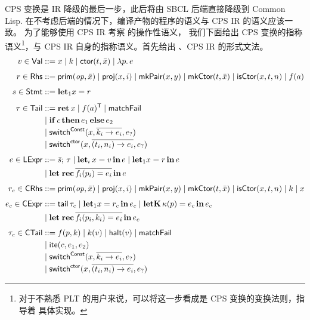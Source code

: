 CPS 变换是 IR 降级的最后一步，此后将由 SBCL 后端直接降级到 Common Lisp.
在不考虑后端的情况下，编译产物的程序的语义与 CPS IR 的语义应该一致。
为了能够使用 CPS IR 考察 \Tigris 的操作性语义，
我们下面给出 CPS 变换的指称语义\footnote{
  对于不熟悉 PLT 的用户来说，可以将这一步看成是 CPS 变换的变换法则，指导着
  具体实现。
}，与 CPS IR 自身的指称语义。首先给出 \Lambdair、CPS IR 的形式文法。
\begingroup\allowdisplaybreaks\setlength{\abovedisplayskip}{3pt}\setlength{\belowdisplayskip}{3pt}
\begin{equation}\label{eq:lambda-cps-formal}
  \begin{aligned}
    v \in \mathsf{Val} &::= x \mid k \mid \mathsf{ctor}(t, \bar{x}) \mid \lambda p.\, e \\[4pt]
    r \in \mathsf{Rhs} &::= \mathsf{prim}(\mathit{op}, \bar{x}) \mid \mathsf{proj}(x, i) \mid \mathsf{mkPair}(x, y) \mid \mathsf{mkCtor}(t, \bar{x}) \mid \mathsf{isCtor}(x, t, n) \mid f(a) \\[4pt]
    s \in \mathsf{Stmt} &::= \mathbf{let}_1 x = r \\[4pt]
    \tau \in \mathsf{Tail} &::=\mathbf{ret}\, x \mid f(a)^{\mathsf{T}} \mid \mathsf{matchFail} \\
    &\mid \mathbf{if}\, c\, \mathbf{then}\, e_1\, \mathbf{else}\, e_2\\[-2pt]
    &\mid \mathsf{switch}^{\mathsf{Const}}(x, \overline{k_i \to e_i}, e_?) \\[-2pt]
    &\mid \mathsf{switch}^{\mathsf{ctor}}(x, \overline{(t_i, n_i) \to e_i}, e_?) \\[4pt]
    e \in \mathsf{LExpr} &::=\bar{s};\, \tau \mid \mathbf{let}_\iota\, x = v\, \mathbf{in}\, e
    \mid \mathbf{let}_1 x = r\, \mathbf{in}\, e\\
    &\mid \mathbf{let\;rec}\, \overline{f_i(p_i) = e_i}\, \mathbf{in}\, e\\[4pt]
    r_c \in \mathsf{CRhs} &::=\mathsf{prim}(\mathit{op}, \bar{x}) \mid \mathsf{proj}(x, i) \mid \mathsf{mkPair}(x, y) \mid \mathsf{mkCtor}(t, \bar{x}) \mid \mathsf{isCtor}(x, t, n) \mid k \mid x\\[4pt]
    e_c \in \mathsf{CExpr} &::=\mathsf{tail}\, \tau_c
    \mid\mathbf{let}_1 x = r_c\, \mathbf{in}\, e_c
    \mid \mathbf{letK}\, \kappa(p) = e_c\, \mathbf{in}\, e_c\\
    &\mid \mathbf{let\;rec}\, \overline{f_i(p_i, k_i) = e_i}\, \mathbf{in}\, e_c\\[4pt]
    \tau_c \in \mathsf{CTail} &::=f(p, k) \mid k(v) \mid \mathsf{halt}(v)
    \mid \mathsf{matchFail}\\
    &\mid  \mathsf{ite}(c, e_1, e_2) \\[-2pt]
    &\mid \mathsf{switch}^{\mathsf{Const}}(x, \overline{k_i \to e_i}, e_?) \\[-2pt]
    &\mid \mathsf{switch}^{\mathsf{ctor}}(x, \overline{(t_i, n_i) \to e_i}, e_?)
  \end{aligned}
\end{equation}
